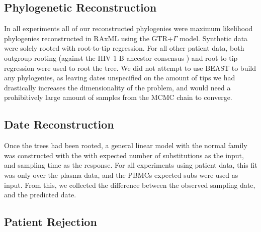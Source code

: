 \subsection{Phylogenetic Reconstruction} \label{subsec:phylo}
In all experiments all of our reconstructed phylogenies were maximum likelihood phylogenies reconstructed in RAxML \citep{Raxml14} using the GTR+$\Gamma$ model. Synthetic data were solely rooted with root-to-tip regression. For all other patient data, both outgroup rooting (against the HIV-1 B ancestor consensus \citep{HIVBANC} ) and root-to-tip regression \cite{Ape04} were used to root the tree. We did not attempt to use BEAST \citep{BEAST} to build any phylogenies, as leaving dates unspecified on the amount of tips we had drastically increases the dimensionality of the problem, and would need a prohibitively large amount of samples from the MCMC chain to converge.

\subsection{Date Reconstruction} \label{subsec:daterecon}
Once the trees had been rooted, a general linear model with the normal family was constructed with the with expected number of substitutions as the input, and sampling time as the response. For all experiments using patient data, this fit was only over the plasma data, and the PBMCs expected subs were used as input. From this, we collected the difference between the observed sampling date, and the predicted date. 


\subsection{Patient Rejection} \label{subsec:hypot}
